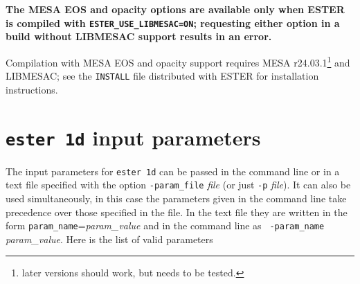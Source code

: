 \textbf{The MESA EOS and opacity options are available only when ESTER is compiled
with {\tt ESTER\_USE\_LIBMESAC=ON}; requesting either option in a build
without LIBMESAC support results in an error.}

Compilation with MESA EOS and opacity support requires MESA r24.03.1\footnote{later versions should work, but needs to be tested.}
and LIBMESAC; see the {\tt INSTALL} file distributed with ESTER for
installation instructions.

\section{{\tt ester 1d} input parameters}\label{ester1dinput}

The input parameters for {\tt ester 1d} can be passed in the command line
or in a text file specified with the option {\tt -param\_file} {\it file}
(or just {\tt -p} {\it file}). It can also be used simultaneously, in
this case the parameters given in the command line take precedence over
those specified in the file. In the text file they are written in the
form {\tt param\_name}={\it param\_value} and in the command line as {\tt
-param\_name} {\it param\_value}.  Here is the list of valid parameters

